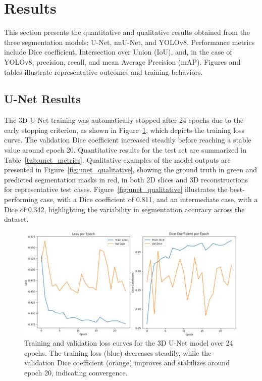 \documentclass[12pt]{article}
\begin{document}



\section{Results}\label{sec:results}

This section presents the quantitative and qualitative results obtained from the three segmentation models: U-Net, nnU-Net, and YOLOv8. Performance metrics include Dice coefficient, Intersection over Union (IoU), and, in the case of YOLOv8, precision, recall, and mean Average Precision (mAP). Figures and tables illustrate representative outcomes and training behaviors.

\subsection{U-Net Results}\label{subsec:unet}

The 3D U-Net training was automatically stopped after 24 epochs due to the early stopping criterion, as shown in Figure~\ref{fig:unet_loss_curve}, which depicts the training loss curve. The validation Dice coefficient increased steadily before reaching a stable value around epoch 20. Quantitative results for the test set are summarized in Table~\ref{tab:unet_metrics}.
%
Qualitative examples of the model outputs are presented in Figure~\ref{fig:unet_qualitative}, showing the ground truth in green and predicted segmentation masks in red, in both 2D slices and 3D reconstructions for representative test cases. Figure~\ref{fig:unet_qualitative} illustrates the best-performing case, with a Dice coefficient of 0.811, and an intermediate case, with a Dice of 0.342, highlighting the variability in segmentation accuracy across the dataset.

\begin{figure}[tp]
    \centering
    \includegraphics[width=\textwidth]{figures/Figure 1.jpg}
    \caption{Training and validation loss curves for the 3D U-Net model over 24 epochs. The training loss (blue) decreases steadily, while the validation Dice coefficient (orange) improves and stabilizes around epoch 20, indicating convergence.}\label{fig:unet_loss_curve}
\end{figure}
\end{document}
